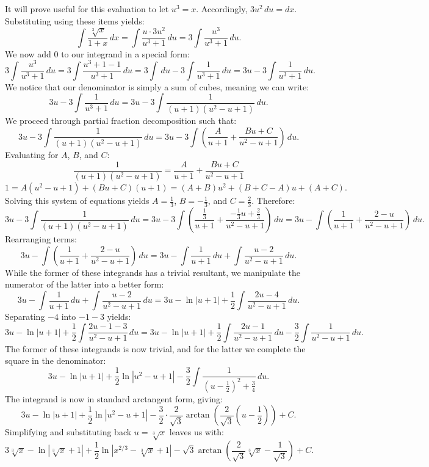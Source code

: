 \begin{questions}
    \begin{solution}
    It will prove useful for this evaluation to let $u^{3}=x$. Accordingly, $3u^{2} \, du=dx$. Substituting using these items yields:
    \[ \int \frac{\sqrt[3]{x}}{1+x} \, dx = \int \frac{u \cdot 3u^{2}}{u^{3}+1} \, du = 3\int \frac{u^{3}}{u^{3}+1} \, du. \]
    We now add 0 to our integrand in a special form:
    \[ 3\int \frac{u^{3}}{u^{3}+1} \, du = 3\int \frac{u^{3}+1-1}{u^{3}+1} \, du = 3\int \, du - 3\int \frac{1}{u^{3}+1} \, du = 3u - 3\int \frac{1}{u^{3}+1} \, du. \]
    We notice that our denominator is simply a sum of cubes, meaning we can write:
    \[ 3u - 3\int \frac{1}{u^{3}+1} \, du = 3u - 3\int \frac{1}{(u+1)(u^{2}-u+1)} \, du. \]
    We proceed through partial fraction decomposition such that:
    \[ 3u - 3\int \frac{1}{(u+1)(u^{2}-u+1)} \, du = 3u - 3\int \left(\frac{A}{u+1} + \frac{Bu+C}{u^{2}-u+1}\right) \, du. \]
    Evaluating for $A$, $B$, and $C$:
    \[ \frac{1}{(u+1)(u^{2}-u+1)} = \frac{A}{u+1} + \frac{Bu+C}{u^{2}-u+1} \]
    \[ 1 = A(u^{2}-u+1) + (Bu+C)(u+1) = (A+B)u^{2} + (B+C-A)u + (A+C). \]
    Solving this system of equations yields $A=\frac{1}{3}$, $B=-\frac{1}{3}$, and $C=\frac{2}{3}$. Therefore:
    \[ 3u - 3\int \frac{1}{(u+1)(u^{2}-u+1)} \, du = 3u - 3\int \left(\frac{\frac{1}{3}}{u+1} + \frac{-\frac{1}{3}u+\frac{2}{3}}{u^{2}-u+1}\right) \, du = 3u - \int \left(\frac{1}{u+1} + \frac{2-u}{u^{2}-u+1}\right) \, du. \]
    Rearranging terms:
    \[ 3u - \int \left(\frac{1}{u+1} + \frac{2-u}{u^{2}-u+1}\right) \, du = 3u - \int \frac{1}{u+1} \, du + \int \frac{u-2}{u^{2}-u+1} \, du. \]
    While the former of these integrands has a trivial resultant, we manipulate the numerator of the latter into a better form:
    \[ 3u - \int \frac{1}{u+1} \, du + \int \frac{u-2}{u^{2}-u+1} \, du = 3u - \ln|u+1| + \frac{1}{2}\int \frac{2u-4}{u^{2}-u+1} \, du. \]
    Separating $-4$ into $-1-3$ yields:
    \[ 3u - \ln|u+1| + \frac{1}{2}\int \frac{2u-1-3}{u^{2}-u+1} \, du = 3u - \ln|u+1| + \frac{1}{2}\int \frac{2u-1}{u^{2}-u+1} \, du - \frac{3}{2}\int \frac{1}{u^{2}-u+1} \, du. \]
    The former of these integrands is now trivial, and for the latter we complete the square in the denominator:
    \[ 3u - \ln|u+1| + \frac{1}{2}\ln|u^{2}-u+1| - \frac{3}{2}\int \frac{1}{\left(u-\frac{1}{2}\right)^{2}+\frac{3}{4}} \, du. \]
    The integrand is now in standard arctangent form, giving:
    \[ 3u - \ln|u+1| + \frac{1}{2}\ln|u^{2}-u+1| - \frac{3}{2}\cdot\frac{2}{\sqrt{3}}\arctan\left(\frac{2}{\sqrt{3}}\left(u-\frac{1}{2}\right)\right) + C. \]
    Simplifying and substituting back $u=\sqrt[3]{x}$ leaves us with:
    \[ 3\sqrt[3]{x} - \ln|\sqrt[3]{x}+1| + \frac{1}{2}\ln|x^{2/3}-\sqrt[3]{x}+1| - \sqrt{3}\arctan\left(\frac{2}{\sqrt{3}}\sqrt[3]{x}-\frac{1}{\sqrt{3}}\right) + C. \]
    \end{solution}


\end{questions}
